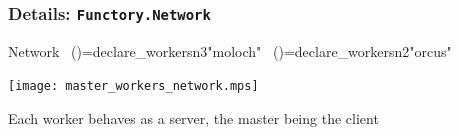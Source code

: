 \documentclass[xcolor=dvipsnames,8pt]{beamer}
\begin{document}
\begin{frame}\frametitle {Details: \texttt{Functory.Network}}
  

\medskip\noindent
{\colorbox{tmpcolor}{\begin{minipage}{\textwidth}\tt\parindent 0pt

\noindent{}\hspace*{1.22ex}Network~\linebreak
\noindent{}\hspace*{1.22ex}()\hspace*{1.22ex}=\hspace*{1.22ex}declare\_{}workers\hspace*{1.22ex}n3\hspace*{1.22ex}"moloch"~\linebreak
\noindent{}\hspace*{1.22ex}()\hspace*{1.22ex}=\hspace*{1.22ex}declare\_{}workers\hspace*{1.22ex}n2\hspace*{1.22ex}"orcus"
\end{minipage}}}


\medskip\noindent

  \begin{center}
    \texttt{[image: master\_workers\_network.mps]}
  \end{center}
  Each worker behaves as a server, the master being the client
  
\end{frame}

\end{document}
